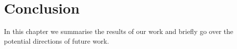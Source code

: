 \chapter{Conclusion}
\label{chap:Conclusion}

In this chapter we summarise the results of our work and briefly go over the potential directions of future work.